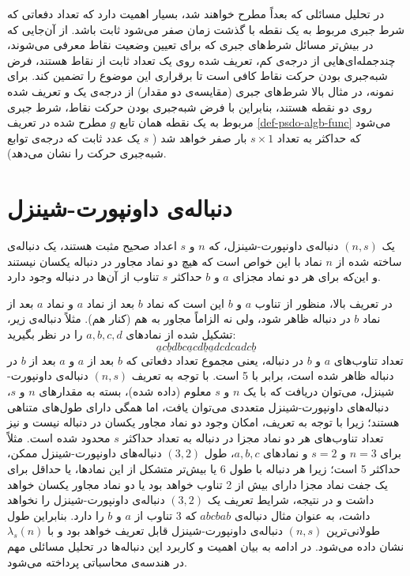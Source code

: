 در تحلیل مسائلی که بعداً مطرح خواهند شد، بسیار اهمیت دارد که تعداد دفعاتی که شرط جبری مربوط به یک نقطه با گذشت زمان صفر می‌شود ثابت باشد. از آن‌جایی که در بیش‌تر مسائل شرط‌های جبری که برای تعیین وضعیت نقاط معرفی می‌شوند، چندجمله‌ای‌هایی از درجه‌ی کم، تعریف شده روی یک تعداد ثابت از نقاط هستند، فرض شبه‌جبری بودن حرکت نقاط کافی است تا برقراری این موضوع را تضمین کند. برای نمونه، در مثال بالا شرط‌های جبری (مقایسه‌ی دو مقدار) از درجه‌ی یک و تعریف شده روی دو نقطه هستند، بنابراین با فرض شبه‌جبری بودن حرکت نقاط، شرط جبری مربوط به یک نقطه همان تابع $g$ مطرح شده در تعریف \ref{def-psdo-algb-func} می‌شود که حداکثر به تعداد $s \times 1$  بار صفر خواهد شد ( $s$ یک عدد ثابت که درجه‌ی توابع شبه‌جبری حرکت را نشان می‌دهد). 

 \section{دنباله‌ی داونپورت-شینزل}\label{sec-DS-sequence}
 \begin{definition}
\label{def-DS-sequ}
یک $(n, s)$ دنباله‌ی داونپورت-شینزل، که $n$ و $s$ اعداد صحیح مثبت هستند، یک دنباله‌ی ساخته شده از $n$ نماد با این خواص است که هیچ دو نماد مجاور در دنباله یکسان نیستند و این‌که برای هر دو نماد مجزای $a$ و $b$  حداکثر $s$  تناوب از آن‌ها در دنباله وجود دارد.
 \end{definition}
در تعریف بالا، منظور از تناوب $a$ و $b$ این است که نماد $b$ بعد از نماد $a$ و نماد $a$ بعد از نماد $b$ در دنباله ظاهر شود، ولی نه الزاماً مجاور به هم (کنار هم). مثلاً دنباله‌ی زیر، تشکیل شده از نمادهای $a, b, c, d$ را در نظر بگیرید: $$\underline{a}c\underline{b}dbc\underline{a}cd
\underline{b}\underline{a}dcdcadc\underline{b}$$ تعداد تناوب‌های $a$ و $b$ در دنباله، یعنی مجموع تعداد دفعاتی که $b$ بعد از $a$  و $a$ بعد از $b$ در دنباله ظاهر شده است، برابر با 5 است. با توجه به تعریف $(n, s)$ دنباله‌ی داونپورت-شینزل، می‌توان دریافت که با یک $n$ و $s$ معلوم (داده شده)، بسته به مقدارهای $n$ و $s$،  دنباله‌‌های داونپورت-شینزل متعددی می‌توان یافت، اما همگی دارای طول‌های متناهی هستند؛ زیرا با توجه به تعریف، امکان وجود دو نماد مجاور یکسان در دنباله نیست و نیز تعداد تناوب‌های هر دو نماد مجزا در دنباله به تعداد حداکثر $s$ محدود شده است. مثلاً برای $n = 3$ و $s = 2$ و نمادهای $a, b, c$،  طول  $(3, 2)$ دنباله‌های داونپورت-شینزل ممکن، حداکثر 5 است؛ زیرا هر دنباله با طول 6 یا بیش‌تر متشکل از این نمادها، یا حداقل برای یک جفت نماد مجزا دارای بیش از 2 تناوب خواهد بود یا دو نماد مجاور یکسان خواهد داشت و در نتیجه، شرایط تعریف یک $(3, 2)$ دنباله‌ی داونپورت-شینزل را نخواهد داشت، به عنوان مثال دنباله‌ی $abcbab$ که 3 تناوب از $a$ و $b$ را دارد. بنابراین طول طولانی‌ترین $(n, s)$ دنباله‌ی داونپورت-شینزل قابل تعریف خواهد بود 
و با $\lambda_{s}(n)$ نشان داده می‌شود. در ادامه به بیان اهمیت و کاربرد این دنباله‌ها در تحلیل مسائلی‌ مهم در هندسه‌ی محاسباتی پرداخته می‌شود.

